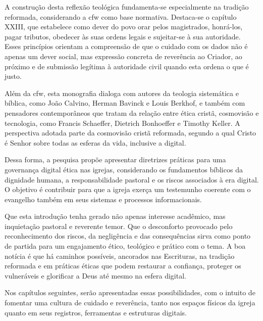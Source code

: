 A construção desta reflexão teológica fundamenta-se especialmente na tradição reformada, considerando a \gls{cfw} como base normativa. Destaca-se o capítulo XXIII, que estabelece como dever do povo orar pelos magistrados, honrá-los, pagar tributos, obedecer às suas ordens legais e sujeitar-se à sua autoridade. Esses princípios orientam a compreensão de que o cuidado com os dados não é apenas um dever social, mas expressão concreta de reverência ao Criador, ao próximo e de submissão legítima à autoridade civil quando esta ordena o que é justo.

Além da \gls{cfw}, esta monografia dialoga com autores da teologia sistemática e bíblica, como João Calvino, Herman Bavinck e Louis Berkhof, e também com pensadores contemporâneos que tratam da relação entre ética cristã, cosmovisão e tecnologia, como Francis Schaeffer, Dietrich Bonhoeffer e Timothy Keller. A perspectiva adotada parte da cosmovisão cristã reformada, segundo a qual Cristo é Senhor sobre todas as esferas da vida, inclusive a digital.

Dessa forma, a pesquisa propõe apresentar diretrizes práticas para uma governança digital ética nas igrejas, considerando os fundamentos bíblicos da dignidade humana, a responsabilidade pastoral e os riscos associados à era digital. O objetivo é contribuir para que a igreja exerça um testemunho coerente com o evangelho também em seus sistemas e processos informacionais.

Que esta introdução tenha gerado não apenas interesse acadêmico, mas inquietação pastoral e reverente temor. Que o desconforto provocado pelo reconhecimento dos riscos, da negligência e das consequências sirva como ponto de partida para um engajamento ético, teológico e prático com o tema. A boa notícia é que há caminhos possíveis, ancorados nas Escrituras, na tradição reformada e em práticas éticas que podem restaurar a confiança, proteger os vulneráveis e glorificar a Deus até mesmo na esfera digital.

Nos capítulos seguintes, serão apresentadas essas possibilidades, com o intuito de fomentar uma cultura de cuidado e reverência, tanto nos espaços físicos da igreja quanto em seus registros, ferramentas e estruturas digitais.
